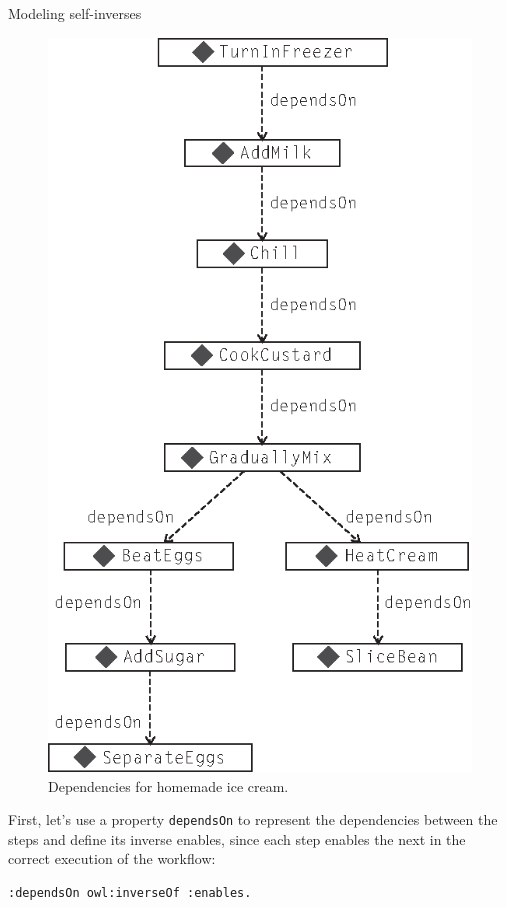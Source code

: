 \begin{challenge}{Modeling self-inverses}
\begin{figure}
\centering
\includegraphics[width=5in]{media/ch9/f09-006.eps}
\caption{Dependencies for homemade ice cream.}
\label{fig:ch9.6}
\end{figure}


First, let's use a property \texttt{dependsOn} to represent the dependencies
between the steps and define its inverse enables, since each step
enables the next in the correct execution of the workflow:

\begin{lstlisting}
:dependsOn owl:inverseOf :enables.
\end{lstlisting}


\end{challenge}
